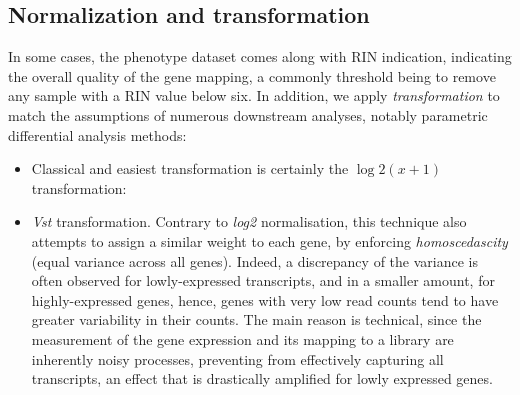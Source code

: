 \subsection{Normalization and transformation} 
\label{normalization-and-transformation}

In some cases, the phenotype dataset comes along with RIN indication, indicating the overall quality of the gene mapping, a commonly threshold being to remove any sample with a RIN value below six. In addition, we apply \emph{transformation} to match the assumptions of numerous downstream analyses, notably parametric differential analysis methods:

\begin{itemize}

\item
  Classical and easiest transformation is certainly the \(\log2(x+1)\) transformation:
\end{itemize}

\begin{Shaded}
\begin{Highlighting}[]
\OtherTok{\textless{}{-}}\SpecialCharTok{::}\NormalTok{(}
\SpecialCharTok{\textasciitilde{}}\SpecialCharTok{+} \NormalTok{))}
\end{Highlighting}
\end{Shaded}

\begin{itemize}

\item
  \emph{Vst} transformation. Contrary to \emph{log2} normalisation, this technique also attempts to assign a similar weight to each gene, by enforcing \emph{homoscedascity} (equal variance across all genes). Indeed, a discrepancy of the variance is often observed for lowly-expressed transcripts, and in a smaller amount, for highly-expressed genes, hence, genes with very low read counts tend to have greater variability in their counts. The main reason is technical, since the measurement of the gene expression and its mapping to a library are inherently noisy processes, preventing from effectively capturing all transcripts, an effect that is drastically amplified for lowly expressed genes\autocite{klaus_reisenauer18}.
\end{itemize}

